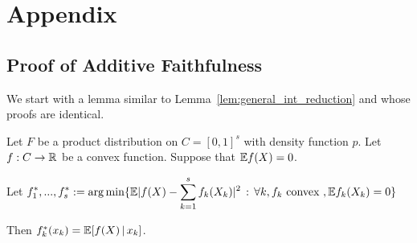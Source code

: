 \section*{Appendix}

\subsection{Proof of Additive Faithfulness}
\label{sec:faithful_proof}

We start with a lemma similar to Lemma~\ref{lem:general_int_reduction} and whose proofs are identical.

\begin{lemma}
\label{lem:int_reduction}
Let $F$ be a product distribution on $C=[0,1]^s$ with density function $p$. Let $f: C \rightarrow {\mathbb R}$ be a convex function. Suppose that ${\mathbb E} f(X) = 0$.

Let $\displaystyle f^*_1,...,f^*_s := \arg\min \{ {\mathbb E} | f(X) - \sum_{k=1}^s f_k(X_k) |^2 \,:\, \forall k, f_k \textrm{ convex }, {\mathbb E} f_k(X_k) = 0\}$ 

Then $f^*_k(x_k) = {\mathbb E}[ f(X) {\,|\,} x_k]$.
\end{lemma}
 
